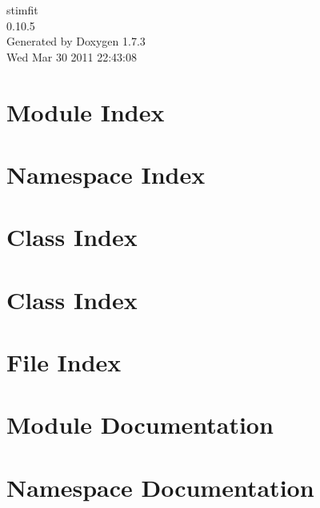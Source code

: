 \documentclass[a4paper]{book}
\begin{document}
\hypersetup{pageanchor=false}
\begin{titlepage}
\vspace*{7cm}
\begin{center}
{\Large stimfit \\[1ex]\large 0.10.5 }\\
\vspace*{1cm}
{\large Generated by Doxygen 1.7.3}\\
\vspace*{0.5cm}
{\small Wed Mar 30 2011 22:43:08}\\
\end{center}
\end{titlepage}
\clearemptydoublepage
{}
\tableofcontents
\clearemptydoublepage
{}
\hypersetup{pageanchor=true}
\chapter{Module Index}

\chapter{Namespace Index}

\chapter{Class Index}

\chapter{Class Index}

\chapter{File Index}

\chapter{Module Documentation}




\chapter{Namespace Documentation}


\end{document}
